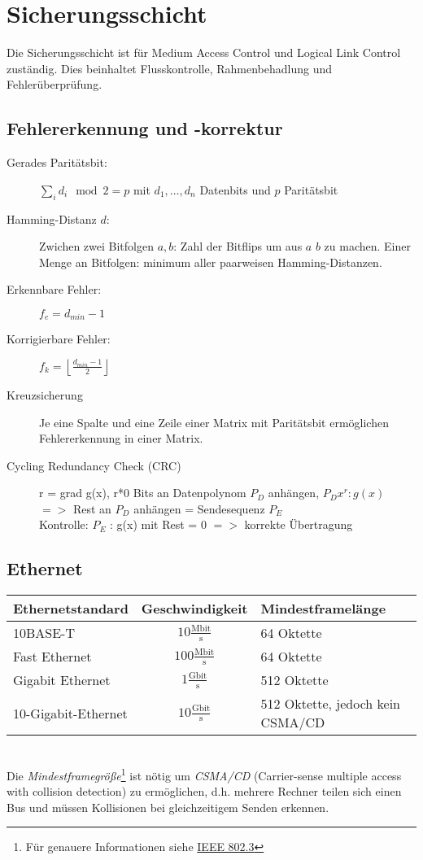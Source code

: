 \documentclass[a4paper]{article}
\begin{document}
\section{Sicherungsschicht}
Die Sicherungsschicht ist für Medium Access Control und Logical Link Control zuständig. Dies beinhaltet Flusskontrolle, Rahmenbehadlung und Fehlerüberprüfung.

\subsection{Fehlererkennung und -korrektur}
\begin{description}
    \item[Gerades Paritätsbit:] $\sum_i d_i \mod 2 = p$ mit $d_1, \dots, d_n$ Datenbits und $p$ Paritätsbit
    \item[Hamming-Distanz $d$:] Zwichen zwei Bitfolgen $a, b$: Zahl der Bitflips um aus $a$ $b$ zu machen. Einer Menge an Bitfolgen: minimum aller paarweisen Hamming-Distanzen.
    \item[Erkennbare Fehler:] $f_e = d_{min}-1$
    \item[Korrigierbare Fehler:] $f_k = \left\lfloor \frac{d_{min}-1}{2} \right\rfloor$
    \item[Kreuzsicherung] Je eine Spalte und eine Zeile einer Matrix mit Paritätsbit ermöglichen Fehlererkennung in einer Matrix.
    \item[Cycling Redundancy Check (CRC)] r = grad g(x), r*0 Bits an Datenpolynom $P_D$ anhängen, $P_D x^r : g(x)$ $=>$ Rest an $P_D$ anhängen = Sendesequenz $P_E$ \\Kontrolle: $P_E$ : g(x) mit Rest = 0 $=>$ korrekte Übertragung
\end{description}

\subsection{Ethernet}
\bgroup
\def\arraystretch{1.5}
    \begin{tabular}{l|c|l}
        \textbf{Ethernetstandard} & \textbf{Geschwindigkeit} & \textbf{Mindestframelänge}\\
        \hline
        10BASE-T & $10\frac{\text{Mbit}}{\text{s}}$ & 64 Oktette\\
        Fast Ethernet & $100\frac{\text{Mbit}}{\text{s}}$ & 64 Oktette\\
        Gigabit Ethernet & $1\frac{\text{Gbit}}{\text{s}}$ & 512 Oktette\\
        10-Gigabit-Ethernet & $10\frac{\text{Gbit}}{\text{s}}$ & 512 Oktette, jedoch kein CSMA/CD
    \end{tabular}
\egroup
\vspace{5mm}\\
Die \textit{Mindestframegröße}\footnote{Für genauere Informationen siehe \href{http://www.trincoll.edu/Academics/MajorsAndMinors/Engineering/Documents/IEEE\%20Standard\%20for\%20Ethernet.pdf}{IEEE 802.3}} ist nötig um \textit{CSMA/CD} (Carrier-sense multiple access with collision detection) zu ermöglichen, d.h. mehrere Rechner teilen sich einen Bus und müssen Kollisionen bei gleichzeitigem Senden erkennen.
\end{document}
